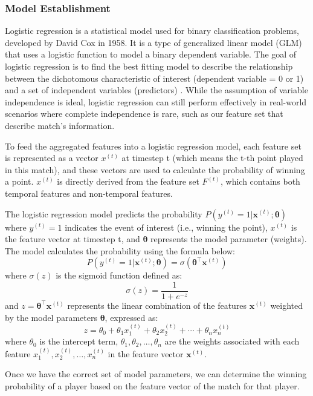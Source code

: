 \documentclass[12pt]{article}  %
\begin{document}
\subsubsection{Model Establishment}
Logistic regression is a statistical model used for binary classification problems, developed by David Cox in 1958. It is a type of generalized linear model (GLM) that uses a logistic function to model a binary dependent variable. The goal of logistic regression is to find the best fitting model to describe the relationship between the dichotomous characteristic of interest (dependent variable = 0 or 1) and a set of independent variables (predictors) \cite{5}. While the assumption of variable independence is ideal, logistic regression can still perform effectively in real-world scenarios where complete independence is rare, such as our feature set that describe match's information.

To feed the aggregated features into a logistic regression model, each feature set is represented as a vector $x^{(t)}$ at timestep t (which means the t-th point played in this match), and these vectors are used to calculate the probability of winning a point. $x^{(t)}$ is directly derived from the feature set \( F^{(t)} \), which contains both temporal features and non-temporal features.

The logistic regression model predicts the probability $ P(y^{(t)}=1|\mathbf{x}^{(t)}; \mathbf{\theta}) $
where $y^{(t)}=1$ indicates the event of interest (i.e., winning the point), $x^{(t)}$ is the feature vector at timestep t, and $\mathbf{\theta}$ represents the model parameter (weights). The model calculates the probability using the formula below:
\[
P(y^{(t)}=1|\mathbf{x}^{(t)}; \mathbf{\theta}) = \sigma(\mathbf{\theta}^\top \mathbf{x}^{(t)})
\]
where \( \sigma(z) \) is the sigmoid function defined as:
\[
\sigma(z) = \frac{1}{1 + e^{-z}}
\]
and \( z = \mathbf{\theta}^\top \mathbf{x}^{(t)} \) represents the linear combination of the features \( \mathbf{x}^{(t)} \) weighted by the model parameters \( \mathbf{\theta} \), expressed as:
\[
z = \theta_0 + \theta_1 x_1^{(t)} + \theta_2 x_2^{(t)} + \cdots + \theta_n x_n^{(t)}
\]
where \( \theta_0 \) is the intercept term, \( \theta_1, \theta_2, \ldots, \theta_n \) are the weights associated with each feature \( x_1^{(t)}, x_2^{(t)}, \ldots, x_n^{(t)} \) in the feature vector \( \mathbf{x}^{(t)} \).

Once we have the correct set of model parameters, we can determine the winning probability of a player based on the feature vector of the match for that player.
\end{document}
